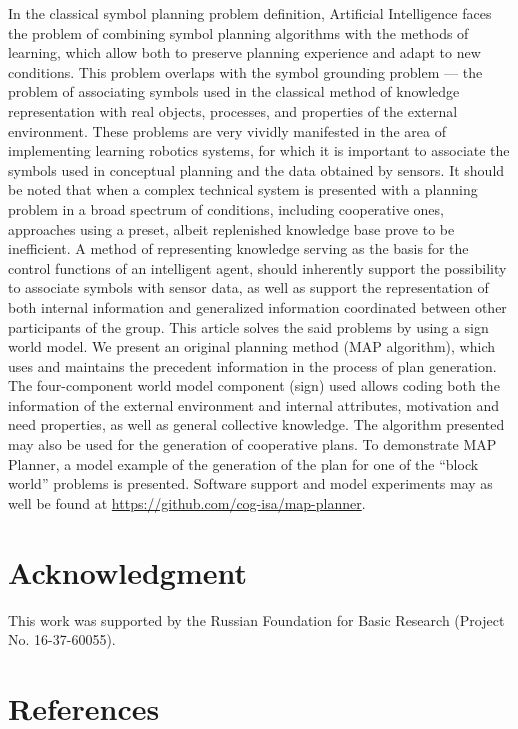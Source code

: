 \documentclass[review]{elsarticle}
\begin{document}
In the classical symbol planning problem definition, Artificial Intelligence faces the problem of combining symbol planning algorithms with the methods of learning, which allow both to preserve planning experience and adapt to new conditions. This problem overlaps with the symbol grounding problem --- the problem of associating symbols used in the classical method of knowledge representation with real objects, processes, and properties of the external environment. These problems are very vividly manifested in the area of implementing learning robotics systems, for which it is important to associate the symbols used in conceptual planning and the data obtained by sensors. It should be noted that when a complex technical system is presented with a planning problem in a broad spectrum of conditions, including cooperative ones, approaches using a preset, albeit replenished knowledge base prove to be inefficient. A method of representing knowledge serving as the basis for the control functions of an intelligent agent, should inherently support the possibility to associate symbols with sensor data, as well as support the representation of both internal information and generalized information coordinated between other participants of the group. This article solves the said problems by using a sign world model. We present an original planning method (MAP algorithm), which uses and maintains the precedent information in the process of plan generation. The four-component world model component (sign) used allows coding both the information of the external environment and internal attributes, motivation and need properties, as well as general collective knowledge. The algorithm presented may also be used for the generation of cooperative plans. To demonstrate MAP Planner, a model example of the generation of the plan for one of the ``block world'' problems is presented. Software support and model experiments may as well be found at \href{https://github.com/cog-isa/map-planner}{https://github.com/cog-isa/map-planner}.

\section*{Acknowledgment}
This work was supported by the Russian Foundation for Basic Research (Project No. 16-37-60055).

\section*{References}


\end{document}
